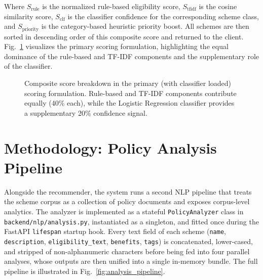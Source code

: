 \documentclass[10pt, journal, twocolumn]{IEEEtran}
\begin{document}
Where $S_\text{rule}$ is the normalized rule-based eligibility score, $S_\text{tfidf}$ is the cosine similarity score, $S_\text{clf}$ is the classifier confidence for the corresponding scheme class, and $S_\text{priority}$ is the category-based heuristic priority boost. All schemes are then sorted in descending order of this composite score and returned to the client. Fig.~\ref{fig:scoring_pie} visualizes the primary scoring formulation, highlighting the equal dominance of the rule-based and TF-IDF components and the supplementary role of the classifier.

\begin{figure}[htbp]
    \centering
    \caption{Composite score breakdown in the primary (with classifier loaded) scoring formulation. Rule-based and TF-IDF components contribute equally (40\% each), while the Logistic Regression classifier provides a supplementary 20\% confidence signal.}
    \label{fig:scoring_pie}
\end{figure}

\section{Methodology: Policy Analysis Pipeline}
Alongside the recommender, the system runs a second NLP pipeline that treats the scheme corpus as a collection of policy documents and exposes corpus-level analytics. The analyzer is implemented as a stateful \texttt{PolicyAnalyzer} class in \texttt{backend/nlp/analysis.py}, instantiated as a singleton, and fitted once during the FastAPI \texttt{lifespan} startup hook. Every text field of each scheme (\texttt{name}, \texttt{description}, \texttt{eligibility\_text}, \texttt{benefits}, \texttt{tags}) is concatenated, lower-cased, and stripped of non-alphanumeric characters before being fed into four parallel analyses, whose outputs are then unified into a single in-memory bundle. The full pipeline is illustrated in Fig.~\ref{fig:analysis_pipeline}.
\end{document}
